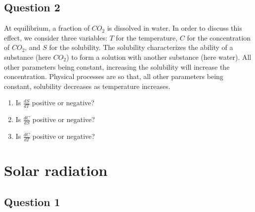 \documentclass{exam}
\begin{document}
\subsection*{Question 2}
\label{q2}

At equilibrium, a fraction of $CO_2$ is dissolved in water. In order to discuss this effect, we consider three variables: $T$ for the temperature, $C$ for the concentration of $CO_2$, and $S$ for the solubility. The solubility characterizes the ability of a substance (here $CO_2$) to form a solution with another substance (here water). All other parameters being constant, increasing the solubility will increase the concentration. Physical processes are so that, all other parameters being constant, solubility decreases as temperature increases.

\begin{enumerate}
    \item Is $\frac{dS}{dT}$ positive or negative?
    \item Is $\frac{dC}{dS}$ positive or negative?
    \item Is $\frac{dC}{dT}$ positive or negative?
\end{enumerate}






\section{Solar radiation}

\subsection*{Question 1}
\end{document}
